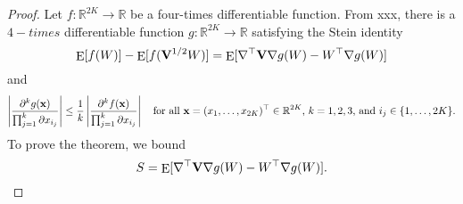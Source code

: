 \documentclass[11pt]{article}
\DeclareMathOperator{\myE}{E}
\theoremstyle{plain}
\theoremstyle{definition}
\theoremstyle{remark}
\begin{document}
\begin{proof}
    Let $f:\mathbb R^{2K} \to \mathbb R$ be a four-times differentiable function.
    From xxx, there is a $4-times$ differentiable function $g : \mathbb R^{2K}\to \mathbb R$ satisfying the Stein identity
\begin{equation*}
    \myE [f(W)]    - \myE [f(\BV^{1/2} W)]=
    \myE [\nabla^\top  \BV \nabla g(W) - W^\top \nabla g(W)]
\end{equation*}
and 
\begin{equation*}
    \left| \frac{\partial^k g(\mathbf{x})}{\prod_{j=1}^k \partial x_{i_j}} \right| 
    \leq
    \frac{1}{k}
    \left| \frac{\partial^k f(\mathbf{x})}{\prod_{j=1}^k \partial x_{i_j}} \right|
    \quad
    \text{for all $\mathbf{x}=(x_1,\ldots, x_{2K})^\top \in \mathbb R^{2K}$,
    $k=1,2,3$, and $i_j \in \{1,\ldots, 2K\}$.}
\end{equation*}
To prove the theorem, we bound
\begin{equation*}
    S=\myE [\nabla^\top \BV \nabla g(W) -W^\top \nabla g(W)].
\end{equation*}


\end{proof}
\end{document}
